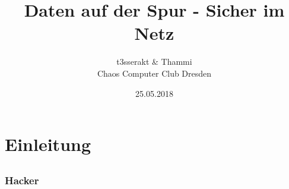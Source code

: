 \documentclass[12pt]{beamer}
\title{Daten auf der Spur - Sicher im Netz}
\author{\small t3sserakt \& Thammi \\\large Chaos Computer Club Dresden}
\date{25.05.2018}
\begin{document}
\maketitle

\section*{Einleitung}
\subsection*{}


\begin{frame}
  \frametitle{Hacker}
  \begin{figure}

\end{figure}
\end{frame}
\end{document}
